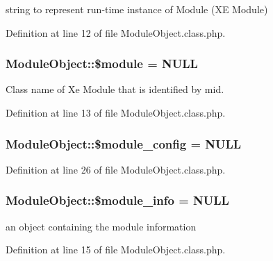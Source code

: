 string to represent run-\/time instance of Module (X\+E Module) 



Definition at line 12 of file Module\+Object.\+class.\+php.

\hypertarget{classModuleObject_a2809af79b38269089ba46bc922061ae8}{}
\subsubsection[{\$module}]{\setlength{\rightskip}{0pt plus 5cm}Module\+Object\+::\$module = N\+U\+L\+L}\label{classModuleObject_a2809af79b38269089ba46bc922061ae8}


Class name of Xe Module that is identified by mid. 



Definition at line 13 of file Module\+Object.\+class.\+php.

\hypertarget{classModuleObject_aed2cac16f365c2b463772e3eeb0c1402}{}
\subsubsection[{\$module\+\_\+config}]{\setlength{\rightskip}{0pt plus 5cm}Module\+Object\+::\$module\+\_\+config = N\+U\+L\+L}\label{classModuleObject_aed2cac16f365c2b463772e3eeb0c1402}


Definition at line 26 of file Module\+Object.\+class.\+php.

\hypertarget{classModuleObject_ac1c9807e77270f2e2abe4f79e1cd2987}{}
\subsubsection[{\$module\+\_\+info}]{\setlength{\rightskip}{0pt plus 5cm}Module\+Object\+::\$module\+\_\+info = N\+U\+L\+L}\label{classModuleObject_ac1c9807e77270f2e2abe4f79e1cd2987}


an object containing the module information 



Definition at line 15 of file Module\+Object.\+class.\+php.

